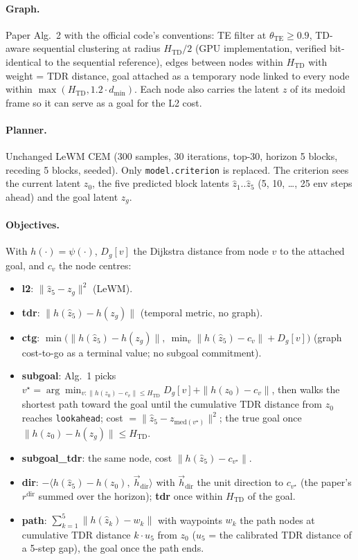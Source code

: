 \documentclass[11pt]{article}
\newcommand{\z}{z}
\newcommand{\psiT}{\psi}
\newcommand{\Htd}{H_{\mathrm{TD}}}
\begin{document}
\paragraph{Graph.} Paper Alg.~2 with the official code's conventions: TE filter at
$\theta_{\mathrm{TE}}\ge 0.9$, TD-aware sequential clustering at radius $\Htd/2$ (GPU
implementation, verified bit-identical to the sequential reference), edges between nodes
within $\Htd$ with weight = TDR distance, goal attached as a temporary node linked to every
node within $\max(\Htd, 1.2\cdot d_{\min})$. Each node also carries the latent $\z$ of its
medoid frame so it can serve as a goal for the L2 cost.

\paragraph{Planner.} Unchanged LeWM CEM (300 samples, 30 iterations, top-30, horizon 5
blocks, receding 5 blocks, seeded). Only \texttt{model.criterion} is replaced. The
criterion sees the current latent $\z_0$, the five predicted block latents
$\hat\z_1..\hat\z_5$ (5, 10, \dots, 25 env steps ahead) and the goal latent $\z_g$.

\paragraph{Objectives.} With $h(\cdot)=\psiT(\cdot)$, $D_g[v]$ the Dijkstra distance from
node $v$ to the attached goal, and $c_v$ the node centres:
\begin{itemize}[nosep]
  \item \textbf{l2}: $\|\hat\z_5-\z_g\|^2$ (LeWM).
  \item \textbf{tdr}: $\|h(\hat\z_5)-h(\z_g)\|$ (temporal metric, no graph).
  \item \textbf{ctg}: $\min\big(\|h(\hat\z_5)-h(\z_g)\|,\ \min_v \|h(\hat\z_5)-c_v\|+D_g[v]\big)$
        (graph cost-to-go as a terminal value; no subgoal commitment).
  \item \textbf{subgoal}: Alg.~1 picks $v^\star=\arg\min_{v:\|h(\z_0)-c_v\|\le\Htd} D_g[v]+\|h(\z_0)-c_v\|$,
        then walks the shortest path toward the goal until the cumulative TDR distance from
        $\z_0$ reaches \texttt{lookahead}; cost $=\|\hat\z_5-\z_{\mathrm{med}(v^\star)}\|^2$;
        the true goal once $\|h(\z_0)-h(\z_g)\|\le\Htd$.
  \item \textbf{subgoal\_tdr}: the same node, cost $\|h(\hat\z_5)-c_{v^\star}\|$.
  \item \textbf{dir}: $-\langle h(\hat\z_5)-h(\z_0),\ \vec h_{\mathrm{dir}}\rangle$ with
        $\vec h_{\mathrm{dir}}$ the unit direction to $c_{v^\star}$ (the paper's $r^{\mathrm{dir}}$
        summed over the horizon); \textbf{tdr} once within $\Htd$ of the goal.
  \item \textbf{path}: $\sum_{k=1}^{5}\|h(\hat\z_k)-w_k\|$ with waypoints $w_k$ the path
        nodes at cumulative TDR distance $k\cdot u_5$ from $\z_0$ ($u_5$ = the calibrated
        TDR distance of a 5-step gap), the goal once the path ends.
\end{itemize}
\end{document}
